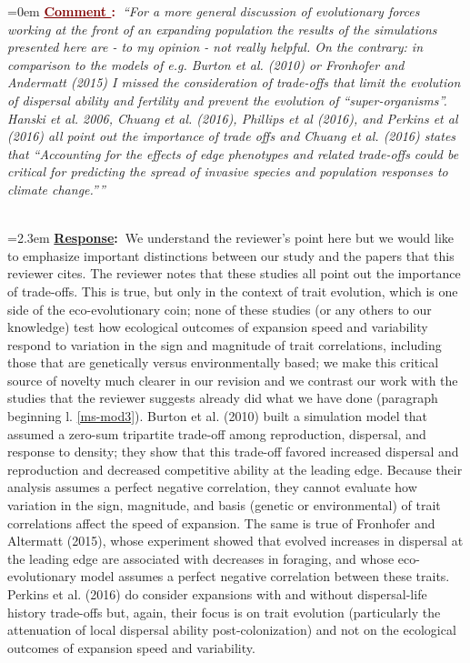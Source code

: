 \documentclass[12pt]{article}
\newcounter{cN}
\newcommand{\comment}[1]{
	\vspace{2em}
	\refstepcounter{cN} %
	\noindent \hangindent=0em \textbf{\textcolor{Maroon}{\uline{Comment \thecN}:~}}\emph{``#1''}
	}
\newcommand{\response}[1]{
	\\[0.25em]
	\hangindent=2.3em \textbf{\textcolor{NavyBlue}{\uline{Response}:~}}#1
	}
\begin{document}
\comment{For a more general discussion of evolutionary forces working at the front of an expanding population the results of the simulations presented here are - to my opinion - not really helpful.
On the contrary: in comparison to the models of e.g. Burton et al. (2010) or Fronhofer and Andermatt (2015) I missed the consideration of trade-offs that limit the evolution of dispersal ability and fertility and prevent the evolution of ``super-organisms''. Hanski et al. 2006, Chuang et al. (2016), Phillips et al (2016), and Perkins et al (2016) all point out the importance of trade offs and Chuang et al. (2016) states that ``Accounting for the effects of edge phenotypes and related trade-offs could be critical for predicting the spread of invasive species and population responses to climate change.''}
\response{We understand the reviewer's point here but we would like to emphasize important distinctions between our study and the papers that this reviewer cites.
The reviewer notes that these studies all point out the importance of trade-offs.
This is true, but only in the context of trait evolution, which is one side of the eco-evolutionary coin; none of these studies (or any others to our knowledge) test how ecological outcomes of expansion speed and variability respond to variation in the sign and magnitude of trait correlations, including those that are genetically versus environmentally based; we make this critical source of novelty much clearer in our revision and we contrast our work with the studies that the reviewer suggests already did what we have done (paragraph beginning l. \ref{ms-mod3}).
Burton et al. (2010) built a simulation model that assumed a zero-sum tripartite trade-off among reproduction, dispersal, and response to density; they show that this trade-off favored increased dispersal and reproduction and decreased competitive ability at the leading edge.
Because their analysis assumes a perfect negative correlation, they cannot evaluate how variation in the sign, magnitude, and basis (genetic or environmental) of trait correlations affect the speed of expansion.
The same is true of Fronhofer and Altermatt (2015), whose experiment showed that evolved increases in dispersal at the leading edge are associated with decreases in foraging, and whose eco-evolutionary model assumes a perfect negative correlation between these traits.
Perkins et al. (2016) do consider expansions with and without dispersal-life history trade-offs but, again, their focus is on trait evolution (particularly the attenuation of local dispersal ability post-colonization) and not on the ecological outcomes of expansion speed and variability.
}
\end{document}
